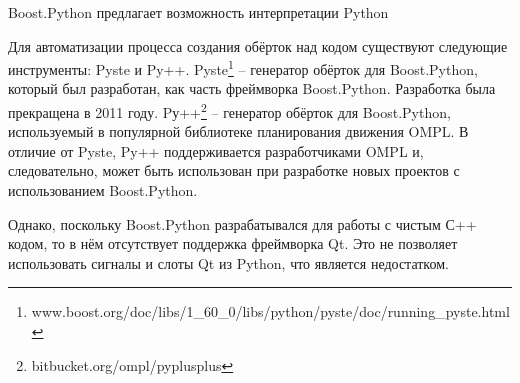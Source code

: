 \documentclass[14pt]{matmex-diploma-custom}
\begin{document}
Boost.Python предлагает возможность интерпретации Python 

Для автоматизации процесса создания обёрток над кодом существуют следующие инструменты: Pyste и Py++. Pyste\footnote{www.boost.org/doc/libs/1\_60\_0/libs/python/pyste/doc/running\_pyste.html} -- генератор обёрток для Boost.Python, который был разработан, как часть фреймворка Boost.Python. Разработка была прекращена в 2011 году. Pу++\footnote{bitbucket.org/ompl/pyplusplus} -- генератор обёрток для Boost.Python, используемый в популярной библиотеке планирования движения OMPL\cite{sucan2012theOMPL}. В отличие от Pyste, Py++ поддерживается разработчиками OMPL и, следовательно, может быть использован при разработке новых проектов с использованием Boost.Python.


Однако, поскольку Boost.Python разрабатывался для работы с чистым С++ кодом, то в нём отсутствует поддержка фреймворка Qt. Это не позволяет использовать сигналы и слоты Qt из Python, что является недостатком. 




\end{document}
